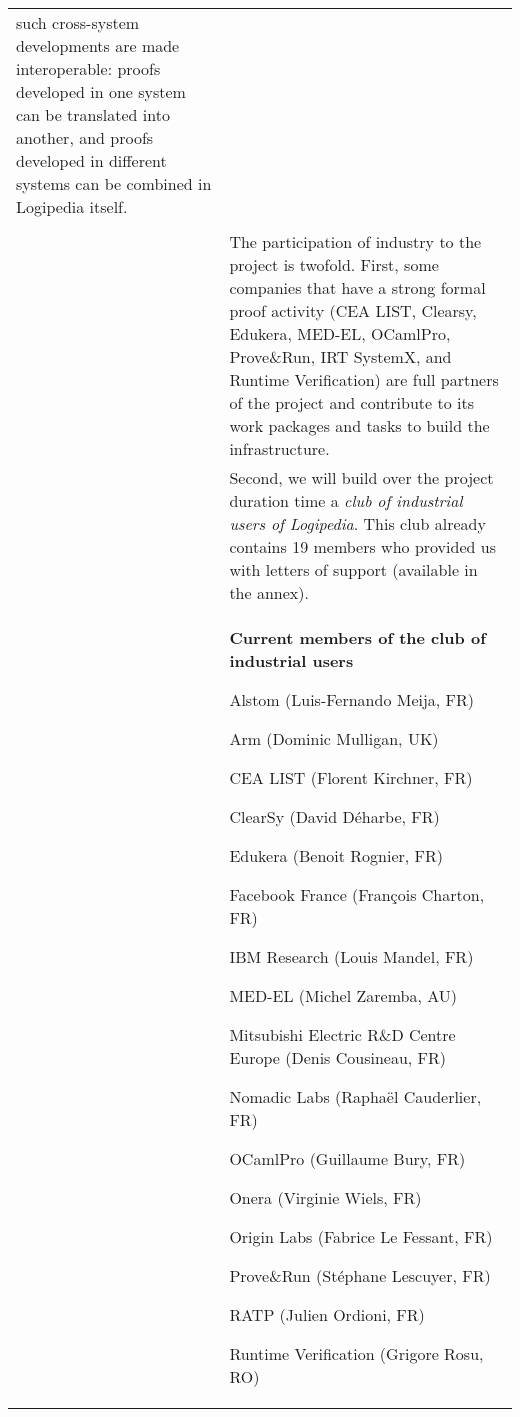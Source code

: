 \begin{longtable}{|p{}|p{}|}
  such cross-system developments are made interoperable: proofs
  developed in one system can be translated into another, and
  proofs developed in different systems can be combined in
  Logipedia itself.\\
&\\
&
\hspace{0.4cm}
The participation of industry to the project is twofold. First,
some companies that have a strong formal proof activity (CEA
LIST, Clearsy, Edukera, MED-EL, OCamlPro, Prove\&Run, IRT SystemX,
and Runtime Verification) are full partners of the project and
contribute to its work packages and tasks to build the
infrastructure.
\\
&
\hspace{0.4cm}
Second, we will build over the project duration time a {\em club of
  industrial users of Logipedia}. This club already contains
19 members who provided us with letters of support (available in the annex).
\\
&
\hspace{0.4cm}
\begin{framed}
\begin{center}
  {\bf \Large Current members of the club of industrial users}
\end{center}
\begin{compactitem}%
\item Alstom (Luis-Fernando Meija, FR)
\item Arm (Dominic Mulligan, UK)
\item CEA LIST (Florent Kirchner, FR)
\item ClearSy (David Déharbe, FR)
\item Edukera (Benoit Rognier, FR)
\item Facebook France (François Charton, FR)
\item IBM Research (Louis Mandel, FR)
\item MED-EL (Michel Zaremba, AU)
\item Mitsubishi Electric R\&D Centre Europe (Denis Cousineau, FR)
\item Nomadic Labs (Raphaël Cauderlier, FR)
\item OCamlPro (Guillaume Bury, FR)
\item Onera (Virginie Wiels, FR)
\item Origin Labs (Fabrice Le Fessant, FR)
\item Prove\&Run (Stéphane Lescuyer, FR)
\item RATP (Julien Ordioni, FR)
\item Runtime Verification (Grigore Rosu, RO)

\end{compactitem}
\end{framed}
\end{longtable}
